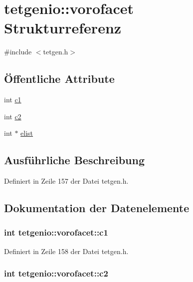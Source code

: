 \hypertarget{structtetgenio_1_1vorofacet}{\section{tetgenio\-:\-:vorofacet Strukturreferenz}
\label{structtetgenio_1_1vorofacet}
}


{\ttfamily \#include $<$tetgen.\-h$>$}

\subsection*{Öffentliche Attribute}
\begin{DoxyCompactItemize}
\item 
int \hyperlink{structtetgenio_1_1vorofacet_a69fcc657a17f0e4565d734fbb34b3239}{c1}
\item 
int \hyperlink{structtetgenio_1_1vorofacet_a368f7dcb47dc65f5655570e942f1e414}{c2}
\item 
int $\ast$ \hyperlink{structtetgenio_1_1vorofacet_a7dc623ea5f4a6006fcc20b2bc8a1f560}{elist}
\end{DoxyCompactItemize}


\subsection{Ausführliche Beschreibung}


Definiert in Zeile 157 der Datei tetgen.\-h.



\subsection{Dokumentation der Datenelemente}
\hypertarget{structtetgenio_1_1vorofacet_a69fcc657a17f0e4565d734fbb34b3239}{
\subsubsection[{c1}]{\setlength{\rightskip}{0pt plus 5cm}int tetgenio\-::vorofacet\-::c1}}\label{structtetgenio_1_1vorofacet_a69fcc657a17f0e4565d734fbb34b3239}


Definiert in Zeile 158 der Datei tetgen.\-h.

\hypertarget{structtetgenio_1_1vorofacet_a368f7dcb47dc65f5655570e942f1e414}{
\subsubsection[{c2}]{\setlength{\rightskip}{0pt plus 5cm}int tetgenio\-::vorofacet\-::c2}}\label{structtetgenio_1_1vorofacet_a368f7dcb47dc65f5655570e942f1e414}


